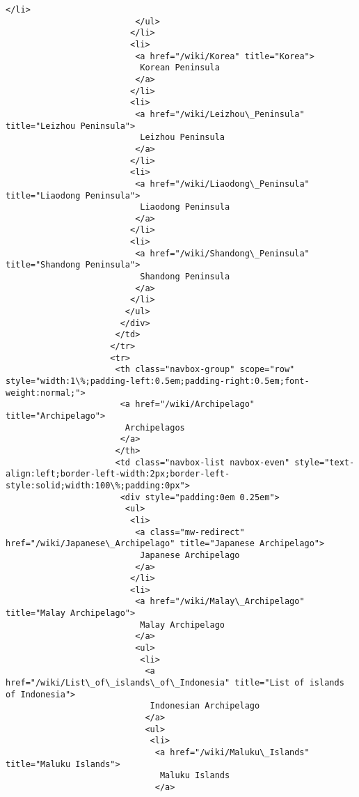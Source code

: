 \documentclass[11pt]{article}
\begin{document}
\begin{Verbatim}[commandchars=\\\{\}]
                           </li>
                          </ul>
                         </li>
                         <li>
                          <a href="/wiki/Korea" title="Korea">
                           Korean Peninsula
                          </a>
                         </li>
                         <li>
                          <a href="/wiki/Leizhou\_Peninsula" title="Leizhou Peninsula">
                           Leizhou Peninsula
                          </a>
                         </li>
                         <li>
                          <a href="/wiki/Liaodong\_Peninsula" title="Liaodong Peninsula">
                           Liaodong Peninsula
                          </a>
                         </li>
                         <li>
                          <a href="/wiki/Shandong\_Peninsula" title="Shandong Peninsula">
                           Shandong Peninsula
                          </a>
                         </li>
                        </ul>
                       </div>
                      </td>
                     </tr>
                     <tr>
                      <th class="navbox-group" scope="row" style="width:1\%;padding-left:0.5em;padding-right:0.5em;font-weight:normal;">
                       <a href="/wiki/Archipelago" title="Archipelago">
                        Archipelagos
                       </a>
                      </th>
                      <td class="navbox-list navbox-even" style="text-align:left;border-left-width:2px;border-left-style:solid;width:100\%;padding:0px">
                       <div style="padding:0em 0.25em">
                        <ul>
                         <li>
                          <a class="mw-redirect" href="/wiki/Japanese\_Archipelago" title="Japanese Archipelago">
                           Japanese Archipelago
                          </a>
                         </li>
                         <li>
                          <a href="/wiki/Malay\_Archipelago" title="Malay Archipelago">
                           Malay Archipelago
                          </a>
                          <ul>
                           <li>
                            <a href="/wiki/List\_of\_islands\_of\_Indonesia" title="List of islands of Indonesia">
                             Indonesian Archipelago
                            </a>
                            <ul>
                             <li>
                              <a href="/wiki/Maluku\_Islands" title="Maluku Islands">
                               Maluku Islands
                              </a>

\end{Verbatim}
\end{document}
